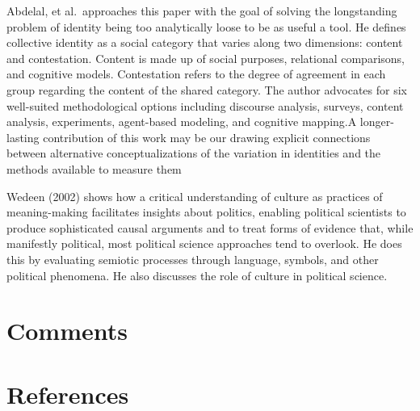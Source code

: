 \documentclass[
  english,
  man]{article}
\begin{document}
Abdelal, et al.~approaches this paper with the goal of solving the longstanding problem of identity being too analytically loose to be as useful a tool. He defines collective identity as a social category that varies along two dimensions: content and contestation. Content is made up of social purposes, relational comparisons, and cognitive models. Contestation refers to the degree of agreement in each group regarding the content of the shared category. The author advocates for six well-suited methodological options including discourse analysis, surveys, content analysis, experiments, agent-based modeling, and cognitive mapping.A longer-lasting contribution of this work may be our drawing explicit connections between alternative conceptualizations of the variation in identities and the methods available to measure them

Wedeen (2002) shows how a critical understanding of culture as practices of meaning-making facilitates insights about politics, enabling political scientists to produce sophisticated causal arguments and to treat forms of evidence that, while manifestly political, most political science approaches tend to overlook. He does this by evaluating semiotic processes through language, symbols, and other political phenomena. He also discusses the role of culture in political science.

\hypertarget{comments}{%
\section{Comments}\label{comments}}

\newpage

\hypertarget{references}{%
\section{References}\label{references}}

\begingroup
\setlength{\parindent}{-0.5in}
\setlength{\leftskip}{0.5in}

\hypertarget{refs}{}

\endgroup
\end{document}
